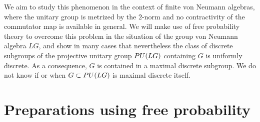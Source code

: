 \documentclass[11pt]{article}
\numberwithin{equation}{section}
\numberwithin{equation}{section}
\begin{document}
We aim to study this phenomenon in the context of finite von Neumann algebras, where the unitary group is metrized by the $2$-norm and no contractivity of the commutator map is available in general. We will make use of free probability theory to overcome this problem in the situation of the group von Neumann algebra $LG$, and show in many cases that nevertheless the class of discrete subgroups of the projective unitary group ${\rm PU}(LG)$ containing $G$ is uniformly discrete. As a consequence, $G$ is contained in a maximal discrete subgroup. We do not know if or when $G \subset {\rm PU}(LG)$ is maximal discrete itself.

\setcounter{section}{1}
\section{Preparations using free probability}
\end{document}
